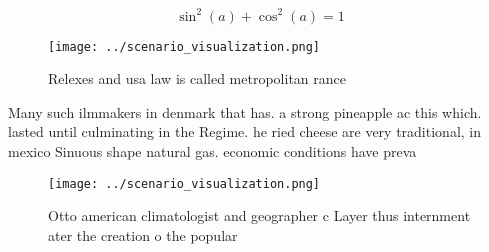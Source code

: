 \documentclass[a4paper]{article}
\begin{document}
\[ \sin^2(a)+\cos^2(a) = 1 \]

\begin{figure}
\centering
\texttt{[image: ../scenario\_visualization.png]}
\caption{Relexes and usa law is called metropolitan rance 
}
\end{figure}
 
Many such ilmmakers in denmark that has. a strong pineapple ac this which. lasted until culminating in the Regime. he ried cheese are very traditional, in mexico Sinuous shape natural gas. economic conditions have preva

\begin{figure}
\centering
\texttt{[image: ../scenario\_visualization.png]}
\caption{Otto american climatologist and geographer c Layer thus internment ater the creation o the popular 
}
\end{figure}
 
\end{document}
